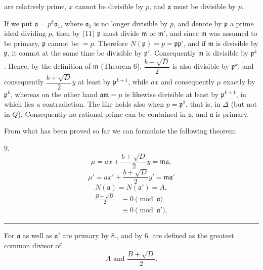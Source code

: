 are relatively prime, $x$ cannot be divisible by $p$, and $\mathfrak{a}$
must be divisible by $p$.

If we put $\mathfrak{a} = p^k \mathfrak{a}_1$, where $\mathfrak{a}_1$ is no longer divisible by $p$,
and denote by $\mathfrak{p}$ a prime ideal dividing $p$, then by
(11) $\mathfrak{p}$ must divide $\mathfrak{m}$ or $\mathfrak{m}'$, and since $\mathfrak{m}$ was assumed to be primary, $\mathfrak{p}$ cannot be $= p$. Therefore $N(\mathfrak{p}) = p = \mathfrak{p}\mathfrak{p}'$,
and if $\mathfrak{m}$ is divisible by $\mathfrak{p}$, it cannot at the same time be divisible by $\mathfrak{p}'$.
Consequently $\mathfrak{m}$ is divisible by $\mathfrak{p}^k$. Hence, by
the definition of $\mathfrak{m}$ (Theorem 6), $\dfrac{b+\sqrt D}{2}$ is also divisible by $\mathfrak{p}^k$,
and consequently $\dfrac{b+\sqrt D}{2} y$ at least by $\mathfrak{p}^{k+1}$, while $ax$ and consequently $\mu$
exactly by $\mathfrak{p}^k$, whereas on the other hand $\mathfrak{a}\mathfrak{m} = \mu$ is likewise divisible at least by $\mathfrak{p}^{k+1}$, in which lies a contradiction. The like holds also when $p = \mathfrak{p}^2$, that is, in $\Delta$ (but not in $Q$).
Consequently no rational prime can be contained in $\mathfrak{a}$,
and $\mathfrak{a}$ is primary.

From what has been proved so far we can formulate the following
theorem:

9. 
\[
\mu = ax + \frac{b+\sqrt D}{2} y = \mathfrak{m}\mathfrak{a},
\]
\[
\mu' = ax' + \frac{b+\sqrt D}{2} y' = \mathfrak{m}\mathfrak{a}'
\]
\[
N(\mathfrak{a}) = N(\mathfrak{a}') = A,
\]
\[
\begin{aligned}
\frac{B+\sqrt D}{2}&\equiv 0 \pmod{\mathfrak{a}}\\
&\equiv 0 \pmod{\mathfrak{a}'},
\end{aligned}
\]

\begin{center}\rule{0.2\linewidth}{0.4pt}\end{center}

For $\mathfrak{a}$ as well as $\mathfrak{a}'$ are primary by 8., and by 6. are
defined as the greatest common divisor of
\[
A \text{ and } \frac{B+\sqrt D}{2}.
\]
